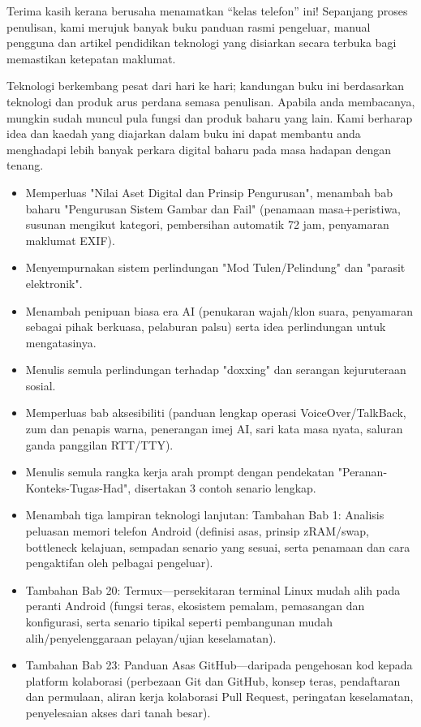
Terima kasih kerana berusaha menamatkan “kelas telefon” ini! Sepanjang proses penulisan, kami merujuk banyak buku panduan rasmi pengeluar, manual pengguna dan artikel pendidikan teknologi yang disiarkan secara terbuka bagi memastikan ketepatan maklumat.

Teknologi berkembang pesat dari hari ke hari; kandungan buku ini berdasarkan teknologi dan produk arus perdana semasa penulisan. Apabila anda membacanya, mungkin sudah muncul pula fungsi dan produk baharu yang lain. Kami berharap idea dan kaedah yang diajarkan dalam buku ini dapat membantu anda menghadapi lebih banyak perkara digital baharu pada masa hadapan dengan tenang.


\begin{itemize}
  \item Memperluas "Nilai Aset Digital dan Prinsip Pengurusan", menambah bab baharu "Pengurusan Sistem Gambar dan Fail" (penamaan masa+peristiwa, susunan mengikut kategori, pembersihan automatik 72 jam, penyamaran maklumat EXIF).
  \item Menyempurnakan sistem perlindungan "Mod Tulen/Pelindung" dan "parasit elektronik".
  \item Menambah penipuan biasa era AI (penukaran wajah/klon suara, penyamaran sebagai pihak berkuasa, pelaburan palsu) serta idea perlindungan untuk mengatasinya.
  \item Menulis semula perlindungan terhadap "doxxing" dan serangan kejuruteraan sosial.
  \item Memperluas bab aksesibiliti (panduan lengkap operasi VoiceOver/TalkBack, zum dan penapis warna, penerangan imej AI, sari kata masa nyata, saluran ganda panggilan RTT/TTY).
  \item Menulis semula rangka kerja arah prompt dengan pendekatan "Peranan-Konteks-Tugas-Had", disertakan 3 contoh senario lengkap.
  \item Menambah tiga lampiran teknologi lanjutan: Tambahan Bab 1: Analisis peluasan memori telefon Android (definisi asas, prinsip zRAM/swap, bottleneck kelajuan, sempadan senario yang sesuai, serta penamaan dan cara pengaktifan oleh pelbagai pengeluar).
  \item Tambahan Bab 20: Termux—persekitaran terminal Linux mudah alih pada peranti Android (fungsi teras, ekosistem pemalam, pemasangan dan konfigurasi, serta senario tipikal seperti pembangunan mudah alih/penyelenggaraan pelayan/ujian keselamatan).
  \item Tambahan Bab 23: Panduan Asas GitHub—daripada pengehosan kod kepada platform kolaborasi (perbezaan Git dan GitHub, konsep teras, pendaftaran dan permulaan, aliran kerja kolaborasi Pull Request, peringatan keselamatan, penyelesaian akses dari tanah besar).
\end{itemize}

